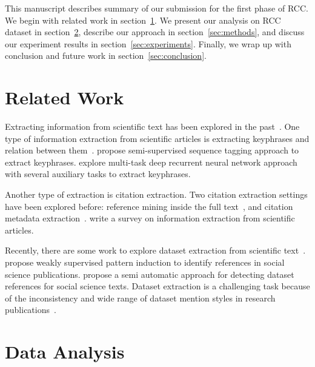 This manuscript describes summary of our submission for the first phase of RCC. We begin with related work in section~\ref{sec:relatedwork}. We present our analysis on RCC dataset in section~\ref{sec:data}, describe our approach in section~\ref{sec:methods}, and discuss our experiment results in section~\ref{sec:experiments}. Finally, we wrap up with conclusion and future work in section~\ref{sec:conclusion}.


\section{Related Work}
\label{sec:relatedwork}

Extracting information from scientific text has been explored in the past~\citep{Peng2004AccurateIE,Nguyen2015ScholarlyDI,Singh2016OCRAR}. One type of information extraction from scientific articles is extracting keyphrases and relation between them~\citep{Augenstein2017SemEval2T}. \citet{Luan2017ScientificIE} propose semi-supervised sequence tagging approach to extract keyphrases. \citet{Augenstein2017MultiTaskLO} explore multi-task deep recurrent neural network approach with several auxiliary tasks to extract keyphrases.

Another type of extraction is citation extraction. Two citation extraction settings have been explored before: reference mining inside the full text~\citep{Alves2018DeepRM}, and citation metadata extraction~\citep{Hetzner2008ASM,Anzaroot2014LearningSL,An2017CitationME}.
\citet{Nasar2018InformationEF} write a survey on information extraction from scientific articles.

Recently, there are some work to explore dataset extraction from scientific text~\citep{Boland2012IdentifyingRT, Ghavimi2016ASA, Ghavimi2016IdentifyingAI}. \citet{Boland2012IdentifyingRT} propose weakly supervised pattern induction to identify references in social science publications. \citet{Ghavimi2016ASA, Ghavimi2016IdentifyingAI} propose a semi automatic approach for detecting dataset references for social science texts. Dataset extraction is a challenging task because of the inconsistency and wide range of dataset mention styles in research publications~\citep{Ghavimi2016IdentifyingAI}.

\section{Data Analysis}
\label{sec:data}

